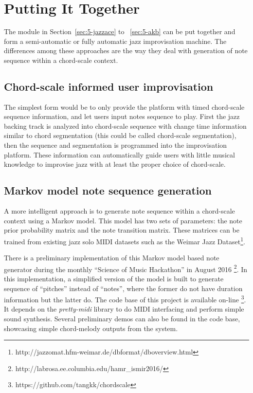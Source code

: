 \section{Putting It Together}\label{sec:5-puttogether}
The module in Section~\ref{sec:5-jazzace} to ~\ref{sec:5-akb} can be put together and form a semi-automatic or fully automatic jazz improvisation machine. The differences among these approaches are the way they deal with generation of note sequence within a chord-scale context.

\subsection{Chord-scale informed user improvisation}
The simplest form would be to only provide the platform with timed chord-scale sequence information, and let users input notes sequence to play. First the jazz backing track is analyzed into chord-scale sequence with change time information similar to chord segmentation (this could be called chord-scale segmentation), then the sequence and segmentation is programmed into the improvisation platform. These information can automatically guide users with little musical knowledge to improvise jazz with at least the proper choice of chord-scale.

\subsection{Markov model note sequence generation}
A more intelligent approach is to generate note sequence within a chord-scale context using a Markov model. This model has two sets of parameters: the note prior probability matrix and the note transition matrix. These matrices can be trained from existing jazz solo MIDI datasets such as the Weimar Jazz Dataset\footnote{http://jazzomat.hfm-weimar.de/dbformat/dboverview.html}\cite{abesser2013introducing}.

There is a preliminary implementation of this Markov model based note generator during the monthly ``Science of Music Hackathon'' in August 2016 \footnote{http://labrosa.ee.columbia.edu/hamr\_ismir2016/}. In this implementation, a simplified version of the model is built to generate sequence of ``pitches'' instead of ``notes'', where the former do not have duration information but the latter do. The code base of this project is available on-line \footnote{https://github.com/tangkk/chordscale}. It depends on the \textit{pretty-midi} \cite{raffel2014intuitive} library to do MIDI interfacing and perform simple sound synthesis. Several preliminary demos can also be found in the code base, showcasing simple chord-melody outputs from the system.

